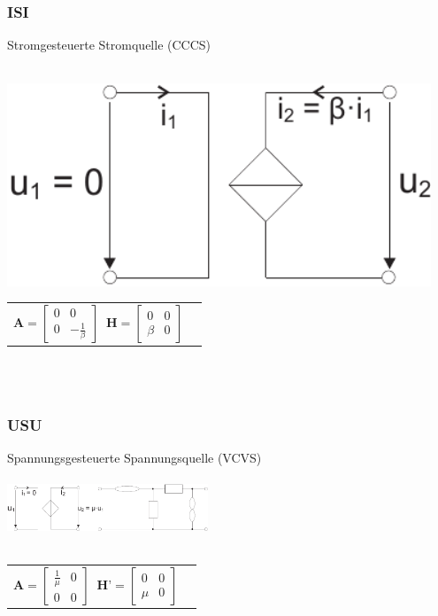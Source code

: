 \documentclass[a4paper,twocolumn,10pt]{article}
\begin{document}
\subsubsection*{ISI}
Stromgesteuerte Stromquelle (CCCS)\\\\
\begin{minipage}[b]{0.23\textwidth}
\includegraphics[width=0.95\textwidth]{Grafiken/OP_ISI}
\end{minipage}
\hfill
\begin{minipage}[b]{0.23\textwidth}
\begin{tabular}{ll}
$\textbf{A}=\begin{bmatrix}0 & 0\\ 0 & -\frac{1}{\beta}\end{bmatrix}\;\;\textbf{H}=\begin{bmatrix}0 & 0\\ \beta & 0\end{bmatrix}$
\end{tabular}\\\\
\end{minipage}

\subsubsection*{USU}
Spannungsgesteuerte Spannungsquelle (VCVS)\\\\
\includegraphics[width=0.45\textwidth]{Grafiken/OP_USU}\\\\
\begin{tabular}{ll}
$\textbf{A}=\begin{bmatrix}\frac{1}{\mu} & 0\\ 0 & 0\end{bmatrix}\;\;\textbf{H'}=\begin{bmatrix}0 & 0\\ \mu & 0\end{bmatrix}$
\end{tabular}
\end{document}
